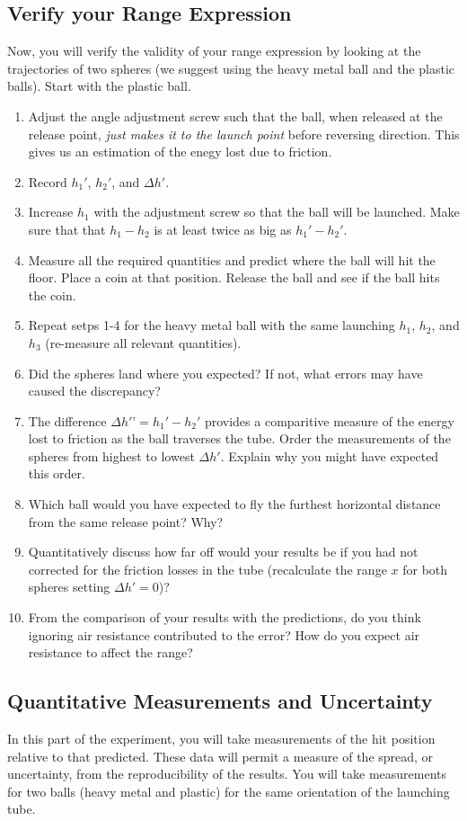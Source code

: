 \subsection{Verify your Range Expression}
Now, you will verify the validity of your range expression by looking at the trajectories of two spheres (we suggest using the heavy metal ball and the plastic balls). Start with the plastic ball. 
\begin{enumerate}
\item Adjust the angle adjustment screw such that the ball, when released at the release point, {\it{just makes it to the launch point}} before reversing direction. This gives us an estimation of the enegy lost due to friction. 
\item Record $h_1'$, $h_2'$, and $\Delta h'$. 
\item Increase $h_1$ with the adjustment screw so that the ball will be launched. Make sure that that $h_1-h_2$ is at least twice as big as $h_1'-h_2'$.
\item Measure all the required quantities and predict where the ball will hit the floor. Place a coin at that position. Release the ball and see if the ball hits the coin.

\item Repeat setps 1-4 for the heavy metal ball with the same launching $h_1$, $h_2$, and $h_3$ (re-measure all relevant quantities).
\item Did the spheres land where you expected? If not, what errors may have caused the discrepancy?
\item The difference $\Delta h'’= h_1' - h_2'$ provides a comparitive measure of the energy lost to friction as the ball traverses the tube. Order the measurements of the spheres from highest to lowest $\Delta h'$. Explain why you might have expected this order.
\item Which ball would you have expected to fly the furthest horizontal distance from the same release point? Why?
\item Quantitatively discuss how far off would your results be if you had not corrected for the friction losses in the tube (recalculate the range $x$ for both spheres setting $\Delta h'=0$)?  
\item From the comparison of your results with the predictions, do you think ignoring air resistance contributed to the error? How do you expect air resistance to affect the range?
\end{enumerate}

\subsection{Quantitative Measurements and Uncertainty}
In this part of the experiment, you will take measurements of the hit position relative to that predicted. These data will permit a measure of the spread, or uncertainty, from the reproducibility of the results. You will take measurements for two balls (heavy metal and plastic) for the same orientation of the launching tube.\myskip

